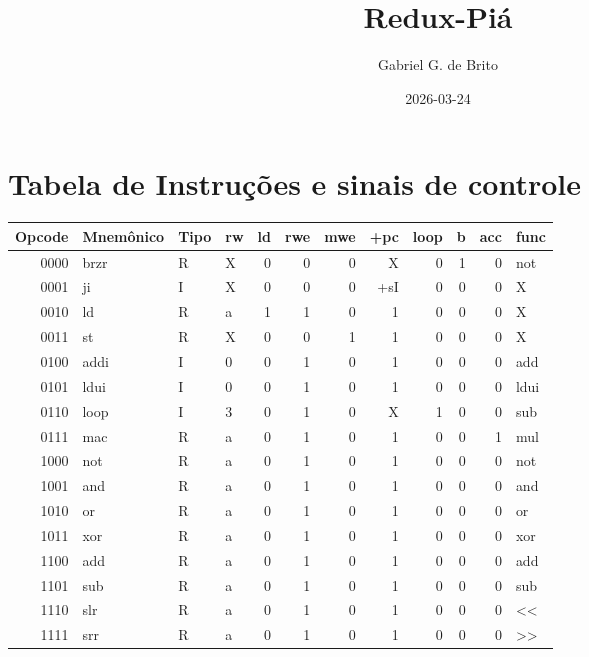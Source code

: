 \documentclass[11pt]{article}
\author{Gabriel G. de Brito}
\date{2026-03-24}
\title{Redux-Piá}
\begin{document}
\maketitle
\tableofcontents

\section{Tabela de Instruções e sinais de controle}
\label{sec:orgd8f552f}
\begin{center}
\begin{tabular}{rlllrrrrrrrl}
Opcode & Mnemônico & Tipo & rw & ld & rwe & mwe & +pc & loop & b & acc & func\\
\hline
0000 & brzr & R & X & 0 & 0 & 0 & X & 0 & 1 & 0 & not\\
0001 & ji & I & X & 0 & 0 & 0 & +sI & 0 & 0 & 0 & X\\
0010 & ld & R & a & 1 & 1 & 0 & 1 & 0 & 0 & 0 & X\\
0011 & st & R & X & 0 & 0 & 1 & 1 & 0 & 0 & 0 & X\\
0100 & addi & I & 0 & 0 & 1 & 0 & 1 & 0 & 0 & 0 & add\\
0101 & ldui & I & 0 & 0 & 1 & 0 & 1 & 0 & 0 & 0 & ldui\\
0110 & loop & I & 3 & 0 & 1 & 0 & X & 1 & 0 & 0 & sub\\
0111 & mac & R & a & 0 & 1 & 0 & 1 & 0 & 0 & 1 & mul\\
1000 & not & R & a & 0 & 1 & 0 & 1 & 0 & 0 & 0 & not\\
1001 & and & R & a & 0 & 1 & 0 & 1 & 0 & 0 & 0 & and\\
1010 & or & R & a & 0 & 1 & 0 & 1 & 0 & 0 & 0 & or\\
1011 & xor & R & a & 0 & 1 & 0 & 1 & 0 & 0 & 0 & xor\\
1100 & add & R & a & 0 & 1 & 0 & 1 & 0 & 0 & 0 & add\\
1101 & sub & R & a & 0 & 1 & 0 & 1 & 0 & 0 & 0 & sub\\
1110 & slr & R & a & 0 & 1 & 0 & 1 & 0 & 0 & 0 & <<\\
1111 & srr & R & a & 0 & 1 & 0 & 1 & 0 & 0 & 0 & >>\\
\end{tabular}
\end{center}
\end{document}
